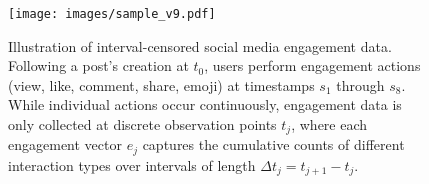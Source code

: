 \begin{figure}[t]
  \centering
  \texttt{[image: images/sample\_v9.pdf]}
  \caption{
    Illustration of interval-censored social media engagement data. Following a post's creation at $t_0$, users perform engagement actions (view, like, comment, share, emoji) at timestamps $s_1$ through $s_8$. While individual actions occur continuously, engagement data is only collected at discrete observation points $t_j$, where each engagement vector $e_j$ captures the cumulative counts of different interaction types over intervals of length $\Delta t_j = t_{j+1} - t_j$.
  }
  \label{fig:sample_ic_mamba}
\end{figure}